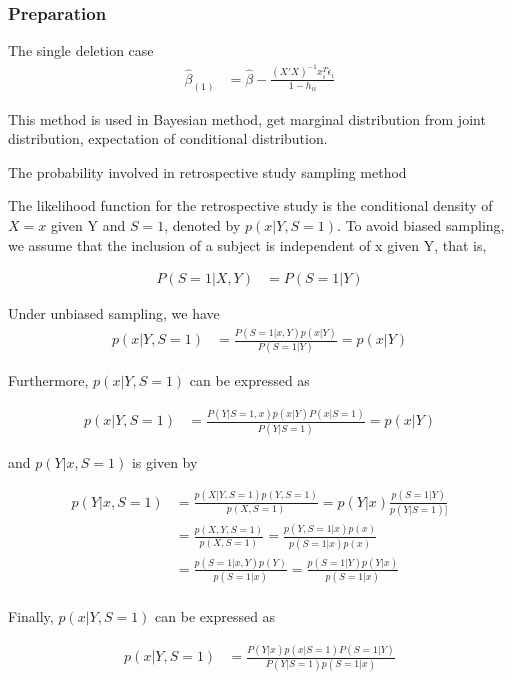   \subsubsection{Preparation}
  The single deletion case
  \begin{align*}
  	\hat{\beta}_{(1)} & = \hat{\beta} - \frac{(X'X)^{-1} x_i^T \hat{\epsilon}_i}{1-h_{ii}}
  \end{align*} 	
  
  This method is used in Bayesian method, get marginal distribution from joint distribution, expectation of conditional distribution.
  
  The probability involved in retrospective study sampling method
  
  The likelihood function for the retrospective study is the conditional density of $X=x$ given Y and $S=1$, denoted by $p(x|Y, S=1)$. To avoid biased sampling, we assume that the inclusion of a subject is independent of x given Y, that is,
  
   \begin{align*}
  	P(S=1| X, Y) &= P(S=1|Y)
  \end{align*} 	

Under unbiased sampling, we have 
   \begin{align*}
	p(x|Y, S=1) &= \frac{P(S=1| x, Y) p(x|Y)}{P(S=1|Y)} = p(x|Y)
\end{align*} 	

Furthermore, $p(x|Y, S=1)$ can be expressed as 

 \begin{align*}
	p(x|Y, S=1) &= \frac{P(Y|S=1, x) p(x|Y)P(x|S=1)}{P(Y|S=1)} = p(x|Y)
\end{align*} 	

and $p(Y|x, S=1)$ is given by

 \begin{align*}
	p(Y|x, S=1) &= \frac{p(X|Y,S=1) p(Y, S=1)}{p(X, S=1)} = p(Y|x) \frac{p(S=1|Y)}{p(Y|S=1)]}\\
	&=  \frac{p(X, Y,S=1) }{p(X, S=1)}  = \frac{p(Y,S=1|x) p(x) }{p(S=1|x) p(x)}  \\
	&= \frac{p(S=1|x,Y) p(Y)}{p(S=1|x) }  = \frac{p(S=1|Y) p(Y|x)}{p(S=1|x) } \\
\end{align*} 	

Finally, $p(x|Y, S=1)$ can be expressed as

 \begin{align*}
	p(x|Y, S=1) &= \frac{P(Y|x) p(x|S=1) P(S=1|Y)}{P(Y|S=1) p(S=1|x)}
\end{align*} 	

